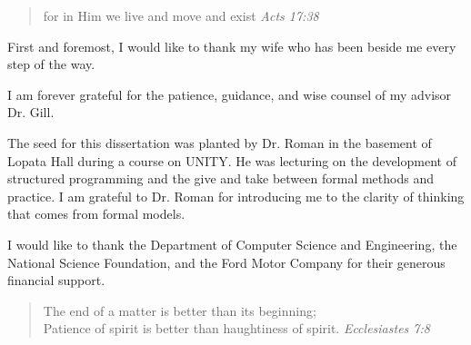 \documentclass[phdthesis,12pt]{wuthesis}
\begin{document}
\VerbatimFootnotes

\frontmatter
\begin{thesistitlepage}
\end{thesistitlepage}

\begin{thesiscopyrightpage}
\end{thesiscopyrightpage}

\begin{singlespace}
\setcounter{page}{2}
\tableofcontents
\listoftables
\listoffigures
\end{singlespace}

\begin{thesisacknowledgments}

\begin{quote}
for in Him we live and move and exist  \emph{Acts 17:38}
\end{quote}

First and foremost, I would like to thank my wife who has been beside me every step of the way.

I am forever grateful for the patience, guidance, and wise counsel of my advisor Dr. Gill.

The seed for this dissertation was planted by Dr. Roman in the basement of Lopata Hall during a course on UNITY.
He was lecturing on the development of structured programming and the give and take between formal methods and practice.
I am grateful to Dr. Roman for introducing me to the clarity of thinking that comes from formal models.

I would like to thank the Department of Computer Science and Engineering, the National Science Foundation, and the Ford Motor Company for their generous financial support.

\begin{quote}
The end of a matter is better than its beginning; \\
Patience of spirit is better than haughtiness of spirit.  \emph{Ecclesiastes 7:8}
\end{quote}
\end{thesisacknowledgments}

\end{document}

